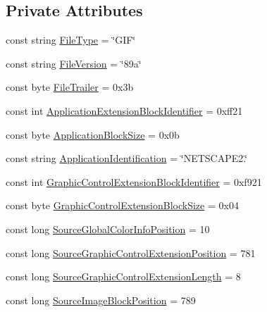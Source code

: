 \subsection*{Private Attributes}
\begin{DoxyCompactItemize}
\item 
const string \mbox{\hyperlink{class_paint___program_1_1_gif_encoder_a5b1c39cb88c56d947065736bc9132dd6}{File\+Type}} = \char`\"{}G\+IF\char`\"{}
\item 
const string \mbox{\hyperlink{class_paint___program_1_1_gif_encoder_ae87017427503b0b1abbad45b707e878e}{File\+Version}} = \char`\"{}89a\char`\"{}
\item 
const byte \mbox{\hyperlink{class_paint___program_1_1_gif_encoder_a057b20de45791f8e36a24c112507e187}{File\+Trailer}} = 0x3b
\item 
const int \mbox{\hyperlink{class_paint___program_1_1_gif_encoder_a7fd1aac1cf7f3fea28f0355fa2355dc6}{Application\+Extension\+Block\+Identifier}} = 0xff21
\item 
const byte \mbox{\hyperlink{class_paint___program_1_1_gif_encoder_ad7526c2ec09538fac4d99d51a4d80321}{Application\+Block\+Size}} = 0x0b
\item 
const string \mbox{\hyperlink{class_paint___program_1_1_gif_encoder_aa24cf121f9f2b444414c7da457edbb7d}{Application\+Identification}} = \char`\"{}N\+E\+T\+S\+C\+A\+P\+E2.\char`\"{}
\item 
const int \mbox{\hyperlink{class_paint___program_1_1_gif_encoder_a8e5eaf58786b0ec4238a9c88fd87da85}{Graphic\+Control\+Extension\+Block\+Identifier}} = 0xf921
\item 
const byte \mbox{\hyperlink{class_paint___program_1_1_gif_encoder_a3076a85af102e60d670fd086f315e4a7}{Graphic\+Control\+Extension\+Block\+Size}} = 0x04
\item 
const long \mbox{\hyperlink{class_paint___program_1_1_gif_encoder_a147dfd6cf02f9cd9bb72e7b4638e4a28}{Source\+Global\+Color\+Info\+Position}} = 10
\item 
const long \mbox{\hyperlink{class_paint___program_1_1_gif_encoder_ac5a3d0830dde1a2094d797d97ad6498e}{Source\+Graphic\+Control\+Extension\+Position}} = 781
\item 
const long \mbox{\hyperlink{class_paint___program_1_1_gif_encoder_a01df6550b9828f02245ed2cd1072ca09}{Source\+Graphic\+Control\+Extension\+Length}} = 8
\item 
const long \mbox{\hyperlink{class_paint___program_1_1_gif_encoder_aadcfd603bed926d325615bebdbfd2cb3}{Source\+Image\+Block\+Position}} = 789

\end{DoxyCompactItemize}

